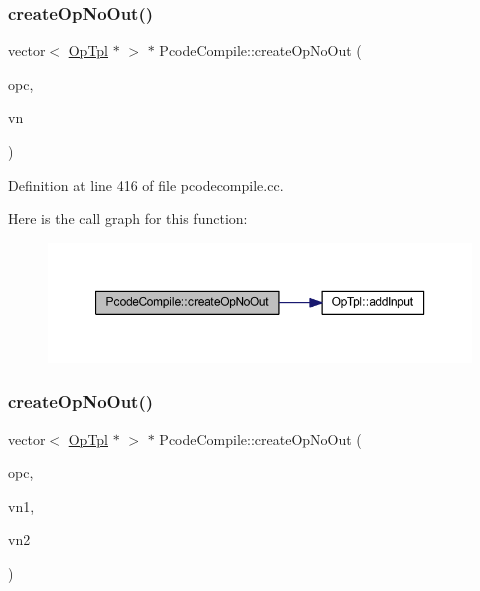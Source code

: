 \subsubsection{\texorpdfstring{createOpNoOut()}{createOpNoOut()}\hspace{0.1cm}{\footnotesize\ttfamily [1/2]}}
{\footnotesize\ttfamily vector$<$ \mbox{\hyperlink{class_op_tpl}{Op\+Tpl}} $\ast$ $>$ $\ast$ Pcode\+Compile\+::create\+Op\+No\+Out (\begin{DoxyParamCaption}\item[{\mbox{\hyperlink{opcodes_8hh_abeb7dfb0e9e2b3114e240a405d046ea7}{Op\+Code}}}]{opc,  }\item[{\mbox{\hyperlink{class_expr_tree}{Expr\+Tree}} $\ast$}]{vn }\end{DoxyParamCaption})}



Definition at line 416 of file pcodecompile.\+cc.

Here is the call graph for this function\+:
\nopagebreak
\begin{figure}[H]
\begin{center}
\leavevmode
\includegraphics[width=350pt]{class_pcode_compile_a0d195a0f919ee62221a5c01bbfbe713c_cgraph}
\end{center}
\end{figure}
\mbox{\label{class_pcode_compile_aa8af8519a707c8922ad4eda925a6500e}} 
\subsubsection{\texorpdfstring{createOpNoOut()}{createOpNoOut()}\hspace{0.1cm}{\footnotesize\ttfamily [2/2]}}
{\footnotesize\ttfamily vector$<$ \mbox{\hyperlink{class_op_tpl}{Op\+Tpl}} $\ast$ $>$ $\ast$ Pcode\+Compile\+::create\+Op\+No\+Out (\begin{DoxyParamCaption}\item[{\mbox{\hyperlink{opcodes_8hh_abeb7dfb0e9e2b3114e240a405d046ea7}{Op\+Code}}}]{opc,  }\item[{\mbox{\hyperlink{class_expr_tree}{Expr\+Tree}} $\ast$}]{vn1,  }\item[{\mbox{\hyperlink{class_expr_tree}{Expr\+Tree}} $\ast$}]{vn2 }\end{DoxyParamCaption})}



